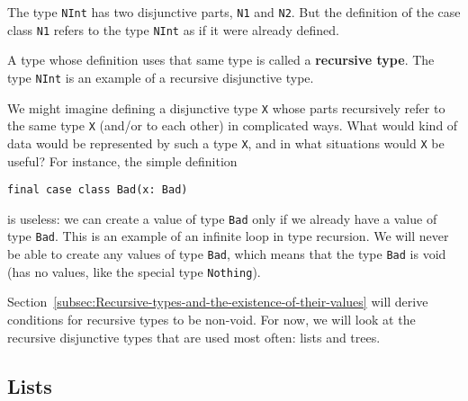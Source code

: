 \noindent The type \lstinline!NInt! has two disjunctive parts, \lstinline!N1!
and \lstinline!N2!. But the definition of the case class \lstinline!N1!
refers to the type \lstinline!NInt! as if it were already defined. 

A type whose definition uses that same type is called a \textbf{recursive
type}. The type \lstinline!NInt! is an example of a recursive disjunctive
type.

We might imagine defining a disjunctive type \lstinline!X! whose
parts recursively refer to the same type \lstinline!X! (and/or to
each other) in complicated ways. What would kind of data would be
represented by such a type \lstinline!X!, and in what situations
would \lstinline!X! be useful? For instance, the simple definition
\begin{lstlisting}
final case class Bad(x: Bad)
\end{lstlisting}
is useless: we can create a value of type \lstinline!Bad! only if
we already have a value of type \lstinline!Bad!. This is an example
of an infinite loop in type recursion.
We will never be able to create any values of type \lstinline!Bad!,
which means that the type \lstinline!Bad! is void
(has no values, like the special type \lstinline!Nothing!). 

Section~\ref{subsec:Recursive-types-and-the-existence-of-their-values}
will derive conditions for recursive types to be non-void. For now,
we will look at the recursive disjunctive types that are used most
often: lists and trees.

\subsection{Lists}

